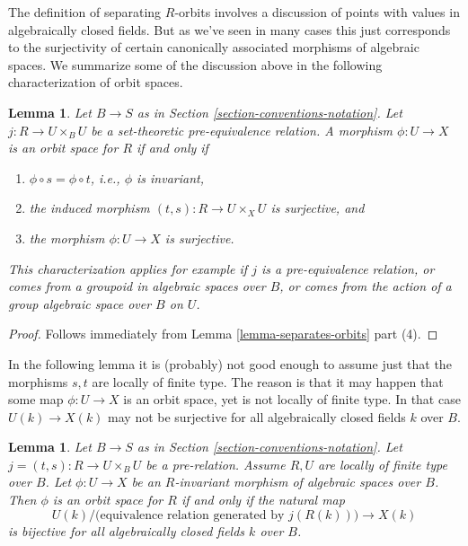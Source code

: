 \documentclass{stacks-project}
\theoremstyle{plain}
\newtheorem{lemma}[subsection]{Lemma}
\theoremstyle{definition}
\theoremstyle{remark}
\numberwithin{equation}{subsection}
\begin{document}
\noindent
The definition of separating $R$-orbits involves a discussion of
points with values in algebraically closed fields. But as we've seen
in many cases this just corresponds to the surjectivity of certain
canonically associated morphisms of algebraic spaces.
We summarize some of the discussion above in the following characterization
of orbit spaces.

\begin{lemma}
\label{lemma-orbit-space}
Let $B \to S$ as in Section \ref{section-conventions-notation}.
Let $j : R \to U \times_B U$ be a set-theoretic pre-equivalence
relation. A morphism $\phi : U \to X$ is an orbit space for $R$ if and only if
\begin{enumerate}
\item $\phi \circ s = \phi \circ t$, i.e., $\phi$ is invariant,
\item the induced morphism $(t, s) : R \to U \times_X U$ is surjective, and
\item the morphism $\phi : U \to X$ is surjective.
\end{enumerate}
This characterization applies for example if $j$ is a pre-equivalence relation,
or comes from a groupoid in algebraic spaces over $B$, or comes from the action
of a group algebraic space over $B$ on $U$.
\end{lemma}

\begin{proof}
Follows immediately from Lemma \ref{lemma-separates-orbits} part (4).
\end{proof}

\noindent
In the following lemma it is (probably) not good enough to assume just that
the morphisms $s, t$ are locally of finite type. The reason is that
it may happen that some map $\phi : U \to X$ is an orbit space, yet is
not locally of finite type. In that case $U(k) \to X(k)$ may not
be surjective for all algebraically closed fields $k$ over $B$.

\begin{lemma}
\label{lemma-orbit-space-locally-finite-type-over-base}
Let $B \to S$ as in Section \ref{section-conventions-notation}.
Let $j = (t, s) : R \to U \times_B U$ be a pre-relation.
Assume $R, U$ are locally of finite type over $B$.
Let $\phi : U \to X$ be an $R$-invariant morphism of algebraic spaces over $B$.
Then $\phi$ is an orbit space for $R$ if and only if the natural map
$$
U(k)/\big(\text{equivalence relation generated by }j(R(k))\big)
\longrightarrow
X(k)
$$
is bijective for all algebraically closed fields $k$ over $B$.
\end{lemma}
\end{document}
